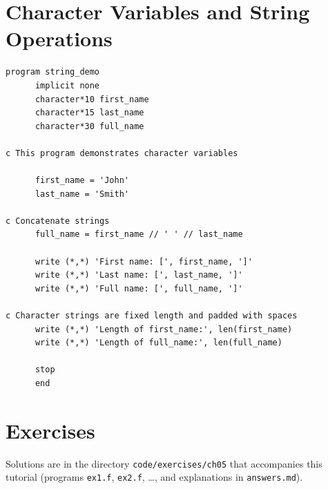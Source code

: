 \section{Character Variables and String Operations}

\begin{lstlisting}[style=fortran77]
      program string_demo
      implicit none
      character*10 first_name
      character*15 last_name
      character*30 full_name
      
c This program demonstrates character variables
      
      first_name = 'John'
      last_name = 'Smith'
      
c Concatenate strings
      full_name = first_name // ' ' // last_name
      
      write (*,*) 'First name: [', first_name, ']'
      write (*,*) 'Last name: [', last_name, ']'
      write (*,*) 'Full name: [', full_name, ']'
      
c Character strings are fixed length and padded with spaces
      write (*,*) 'Length of first_name:', len(first_name)
      write (*,*) 'Length of full_name:', len(full_name)
      
      stop
      end
\end{lstlisting}

\section{Exercises}

Solutions are in the directory \texttt{code/exercises/ch05} that accompanies this tutorial (programs \texttt{ex1.f}, \texttt{ex2.f}, \ldots, and explanations in \texttt{answers.md}).

